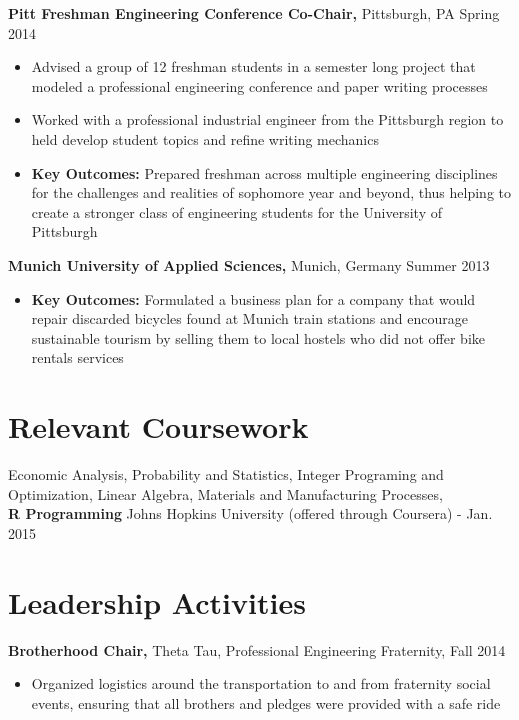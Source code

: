 \documentclass[margin]{res}
\begin{document}
\begin{resume}
{\bf Pitt Freshman Engineering Conference Co-Chair,} Pittsburgh, PA \hfill  Spring 2014
\begin{itemize} \itemsep -2pt %
\item Advised a group of 12 freshman students in a semester long project that modeled a professional engineering conference and paper writing processes
\item Worked with a professional industrial engineer from the Pittsburgh region to held develop student topics and refine writing mechanics
\item \textbf{Key Outcomes:} Prepared freshman across multiple engineering disciplines for the challenges and realities of sophomore year and beyond, thus helping to create a stronger class of engineering students for the University of Pittsburgh
\end{itemize}

{\bf Munich University of Applied Sciences,} Munich, Germany \hfill Summer 2013
\begin{itemize} \itemsep -2pt %
\item \textbf{Key Outcomes:} Formulated a business plan for a company that would repair discarded bicycles found at Munich train stations and encourage sustainable tourism by selling them to local hostels who did not offer bike rentals services
\end{itemize}

\section{Relevant Coursework}
Economic Analysis, Probability and Statistics, Integer Programing and Optimization, Linear Algebra, Materials and Manufacturing Processes, %
\\{\bf R Programming} Johns Hopkins University (offered through Coursera) - Jan. 2015


\section{Leadership   Activities} 
{\bf Brotherhood Chair,} Theta Tau, Professional Engineering Fraternity, \hfill Fall 2014 
\begin{itemize} %
\item  Organized logistics around the transportation to and from fraternity social events, ensuring that all brothers and pledges were provided with a safe ride
\end{itemize}


\end{resume}
\end{document}
